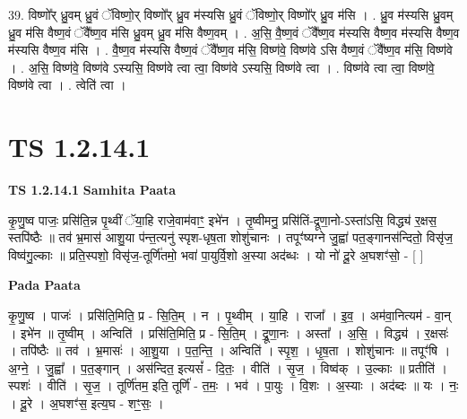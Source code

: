 \documentclass[17pt]{extarticle}
\begin{document}
39. विष्णो᳚र् ध्रु॒वम् ध्रु॒वं ॅविष्णो॒र् विष्णो᳚र् ध्रु॒व म॑स्यसि ध्रु॒वं ॅविष्णो॒र् विष्णो᳚र् ध्रु॒व म॑सि । . ध्रु॒व म॑स्यसि ध्रु॒वम् ध्रु॒व म॑सि वैष्ण॒वं ॅवै᳚ष्ण॒व म॑सि ध्रु॒वम् ध्रु॒व म॑सि वैष्ण॒वम् । . अ॒सि॒ वै॒ष्ण॒वं ॅवै᳚ष्ण॒व म॑स्यसि वैष्ण॒व म॑स्यसि वैष्ण॒व म॑स्यसि वैष्ण॒व म॑सि । . वै॒ष्ण॒व म॑स्यसि वैष्ण॒वं ॅवै᳚ष्ण॒व म॑सि॒ विष्ण॑वे॒ विष्ण॑वे ऽसि वैष्ण॒वं ॅवै᳚ष्ण॒व म॑सि॒ विष्ण॑वे । . अ॒सि॒ विष्ण॑वे॒ विष्ण॑वे ऽस्यसि॒ विष्ण॑वे त्वा त्वा॒ विष्ण॑वे ऽस्यसि॒ विष्ण॑वे त्वा । . विष्ण॑वे त्वा त्वा॒ विष्ण॑वे॒ विष्ण॑वे त्वा । . त्वेति॑ त्वा । \newline
\pagebreak
{}
\section*{ TS 1.2.14.1 }

\textbf{TS 1.2.14.1 } \newline
\textbf{Samhita Paata} \newline

कृ॒णु॒ष्व पाजः॒ प्रसि॑ति॒न्न पृ॒थ्वीं ॅया॒हि राजे॒वाम॑वाꣳ॒॒ इभे॑न । तृ॒ष्वीमनु॒ प्रसि॑तिं-द्रूणा॒नो-ऽस्ता॑ऽसि॒ विद्ध्य॑ र॒क्षस॒ स्तपि॑ष्ठैः ॥ तव॑ भ्र॒मास॑ आशु॒या प॑न्त॒त्यनु॑ स्पृश-धृष॒ता शोशु॑चानः । तपूꣳ॑ष्यग्ने जु॒ह्वा॑ पत॒ङ्गानस॑न्दितो॒ विसृ॑ज॒ विष्व॑गु॒ल्काः ॥ प्रति॒स्पशो॒ विसृ॑ज॒-तूर्णि॑तमो॒ भवा॑ पा॒युर्वि॒शो अ॒स्या अद॑ब्धः । यो नो॑ दू॒रे अ॒घशꣳ॑सो॒ - [ ] \newline

\textbf{Pada Paata} \newline

कृ॒णु॒ष्व । पाजः॑ । प्रसि॑ति॒मिति॒ प्र - सि॒ति॒म् । न । पृ॒थ्वीम् । या॒हि । राजा᳚ । इ॒व॒ । अम॑वा॒नित्यम॑ - वा॒न् । इभे॑न ॥ तृ॒ष्वीम् । अन्विति॑ । प्रसि॑ति॒मिति॒ प्र - सि॒ति॒म् । द्रू॒णा॒नः । अस्ता᳚ । अ॒सि॒ । विद्ध्य॑ । र॒क्षसः॑ । तपि॑ष्ठैः ॥ तव॑ । भ्र॒मासः॑ । आ॒शु॒या । प॒त॒न्ति॒ । अन्विति॑ । स्पृ॒श॒ । धृ॒ष॒ता । शोशु॑चानः ॥ तपूꣳ॑षि । अ॒ग्ने॒ । जु॒ह्वा᳚ । प॒त॒ङ्गान् । अस॑न्दित॒ इत्यसं᳚ - दि॒तः॒ । वीति॑ । सृ॒ज॒ । विष्व॑क् । उ॒ल्काः ॥ प्रतीति॑ । स्पशः॑ । वीति॑ । सृ॒ज॒ । तूर्णि॑तम॒ इति॒ तूर्णि॑ - त॒मः॒ । भव॑ । पा॒युः । वि॒शः । अ॒स्याः । अद॑ब्दः ॥ यः । नः॒ । दू॒रे । अ॒घशꣳ॑स॒ इत्य॒घ - शꣳ॒॒सः॒ ।  \newline
\end{document}
